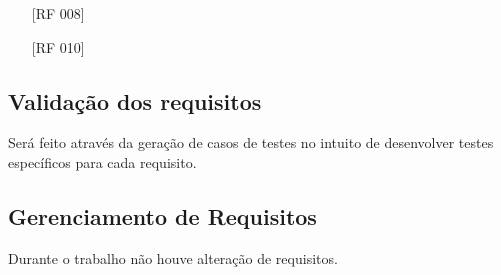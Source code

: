 \documentclass[ppginf, pep]{esinucpel}
\begin{document}
\begin{itemize}
\item[\textbullet] [RF 008]
\item[\textbullet] [RF 010]
\end{itemize}

\subsection{Validação dos requisitos}

Será feito através da geração de casos de testes no intuito de desenvolver testes específicos para cada requisito.

\subsection{Gerenciamento de Requisitos}

Durante o trabalho não houve alteração de requisitos.






\end{document}
